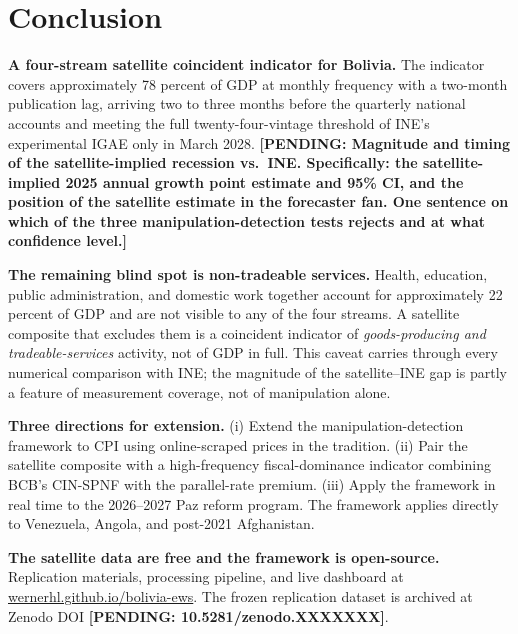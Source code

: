 \documentclass[11pt,letterpaper]{article}
\newcommand{\pend}[1]{\textcolor{yellow!60!black}{\textbf{[PENDING: #1]}}}
\newcommand{\claim}[1]{\textbf{#1.}}
\begin{document}
\section{Conclusion}
\label{sec:conclusion}

\claim{A four-stream satellite coincident indicator for Bolivia} The indicator covers approximately \num{78} percent of GDP at monthly frequency with a two-month publication lag, arriving two to three months before the quarterly national accounts and meeting the full twenty-four-vintage threshold of INE's experimental IGAE only in March \num{2028}. \pend{Magnitude and timing of the satellite-implied recession vs.\ INE. Specifically: the satellite-implied 2025 annual growth point estimate and 95\% CI, and the position of the satellite estimate in the forecaster fan. One sentence on which of the three manipulation-detection tests rejects and at what confidence level.}

\claim{The remaining blind spot is non-tradeable services} Health, education, public administration, and domestic work together account for approximately \num{22} percent of GDP and are not visible to any of the four streams. A satellite composite that excludes them is a coincident indicator of \emph{goods-producing and tradeable-services} activity, not of GDP in full. This caveat carries through every numerical comparison with INE; the magnitude of the satellite--INE gap is partly a feature of measurement coverage, not of manipulation alone.

\claim{Three directions for extension} (i) Extend the manipulation-detection framework to CPI using online-scraped prices in the \citet{cavallo2013} tradition. (ii) Pair the satellite composite with a high-frequency fiscal-dominance indicator combining BCB's CIN-SPNF with the parallel-rate premium. (iii) Apply the framework in real time to the \numrange{2026}{2027} Paz reform program. The framework applies directly to Venezuela, Angola, and post-\num{2021} Afghanistan.

\claim{The satellite data are free and the framework is open-source} Replication materials, processing pipeline, and live dashboard at \url{wernerhl.github.io/bolivia-ews}. The frozen replication dataset is archived at Zenodo DOI \pend{10.5281/zenodo.XXXXXXX}.

\appendix
\end{document}
